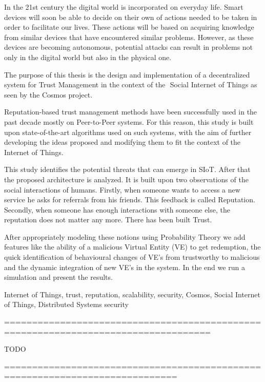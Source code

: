 \begin{abstracten}
In the 21st century the digital world is incorporated on everyday life. Smart devices will soon be able to decide on their own of actions needed to be taken in order to facilitate our lives. 
These actions will be based on acquiring knowledge from similar devices that have encountered similar problems. However, as these devices are becoming autonomous, 
potential attacks can result in problems not only in the digital world but also in the physical one.  
 
The purpose of this thesis is the design and implementation of a decentralized system for Trust Management in the context of the ​
Social Internet of Things​
 as seen by the ​Cosmos​ project. 
 
Reputation-­based trust management methods have been successfully used in the  past 
decade mostly on Peer-­to-­Peer systems. For this reason, this study is built upon 
state-­of-­the-­art algorithms used on such systems, with the aim of further developing the 
ideas proposed and modifying them to fit the context of the Internet of Things. 
 
This study identifies the potential threats that can emerge in SIoT. After that the proposed 
architecture is analyzed. It is built upon two observations of the social interactions of humans.
 Firstly, when someone wants to access a new service he asks for referrals from 
his friends. This feedback is called Reputation. Secondly, when someone has enough 
interactions with someone else, the reputation does not matter any more. There has been built Trust. 
 
After appropriately modeling these notions using Probability Theory we add features like 
the ability of a malicious Virtual Entity (VE) to get redemption, the quick identification of 
behavioural changes of VE’s from trustworthy to malicious and the dynamic integration of 
new VE’s in the system. In the end we run a simulation and present the results.
	\begin{keywordsen}
    Internet of Things, trust, reputation, scalability, security, Cosmos, Social Internet of Things, Distributed Systems security 
	\end{keywordsen}
\end{abstracten}

\begin{acknowledgementsgr}
===================================================================================

TODO

=============================================================================
\end{acknowledgementsgr}
